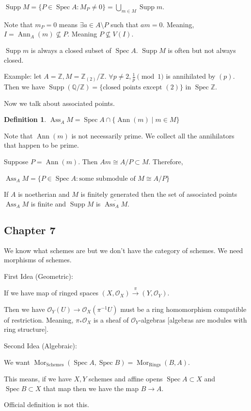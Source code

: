\documentclass{article}
\theoremstyle{definition}
\newtheorem*{definition}{Definition}
\begin{document}
    \(\operatorname{Supp} M = \{ P \in \operatorname{Spec} A : M_P \neq 0 \} = \bigcup_{m\in M} \operatorname{Supp} m\).

    Note that \(m_P = 0\) means \(\exists a\in A \setminus P\) such that \(am = 0\). Meaning, \(I = \operatorname{Ann}_A(m) \nsubseteq P\). Meaning \(P \nsubseteq V(I)\).

    \(\operatorname{Supp} m\) is always a closed subset of \(\operatorname{Spec} A\). \(\operatorname{Supp} M\) is often but not always closed.

    Example: let \(A = \mathbb{Z}, M = \mathbb{Z}_{(2)} / \mathbb{Z}\). \(\forall p\neq 2, \frac{1}{p} \pmod 1\) is annihilated by \((p)\). Then we have \(\operatorname{Supp} (\mathbb{Q} / \mathbb{Z}) = \{ \text{closed points except } (2)\}\) in \(\operatorname{Spec} \mathbb{Z}\). 

    Now we talk about associated points.

    \begin{definition}
        \(\operatorname{Ass}_A M = \operatorname{Spec} A \cap \{ \operatorname{Ann} (m) \mid m \in M \}\)

        Note that \(\operatorname{Ann} (m)\) is not necessarily prime. We collect all the annihilators that happen to be prime.

        Suppose \(P = \operatorname{Ann} (m)\). Then \(Am \cong A / P \subset M\). Therefore,

        \(\operatorname{Ass}_A M = \{ P \in \operatorname{Spec} A : \text{some submodule of } M \cong A / P  \}\) 
    \end{definition}

    If \(A\) is noetherian and \(M\) is finitely generated then the set of associated points \(\operatorname{Ass}_A M\) is finite and \(\operatorname{Supp} M\) is \(\overline{\operatorname{Ass}_A M}\).

    \subsection*{Chapter 7}

    We know what schemes are but we don't have the category of schemes. We need morphisms of schemes.

    First Idea (Geometric):

    If we have map of ringed spaces \((X, \mathcal{O}_X) \xrightarrow{\pi} (Y, \mathcal{O}_Y)\).

    Then we have \(\mathcal{O}_Y(U) \to \mathcal{O}_X (\pi ^{-1} U)\) must be a ring homomorphism compatible of restriction. Meaning, \(\pi_{\ast} \mathcal{O}_X\) is a sheaf of \(\mathcal{O}_Y\)-algebras [algebras are modules with ring structure].

    Second Idea (Algebraic):

    We want \(\operatorname{Mor}_{\text{Schemes}} (\operatorname{Spec} A, \operatorname{Spec} B) = \operatorname{Mor} _{\text{Rings}}(B,A)\).

    This means, if we have \(X, Y\) schemes and affine opens \(\operatorname{Spec} A \subset X\) and \(\operatorname{Spec} B \subset X\) that map then we have the map \(B \to A\).

    Official definition is not this.
\end{document}

